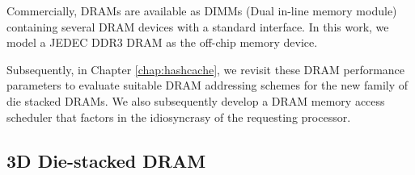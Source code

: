 \par Commercially, DRAMs are available as DIMMs (Dual in-line memory module) containing several DRAM devices with a standard interface. In this work, we model a JEDEC DDR3 DRAM as the off-chip memory device.
\par Subsequently, in Chapter \ref{chap:hashcache}, we revisit these DRAM performance parameters to evaluate suitable DRAM addressing schemes for the new family of die stacked DRAMs. We also subsequently develop a DRAM memory access scheduler that factors in the idiosyncrasy of the requesting processor.

\subsection{3D Die-stacked DRAM} \label{stacked-dram-intro}

